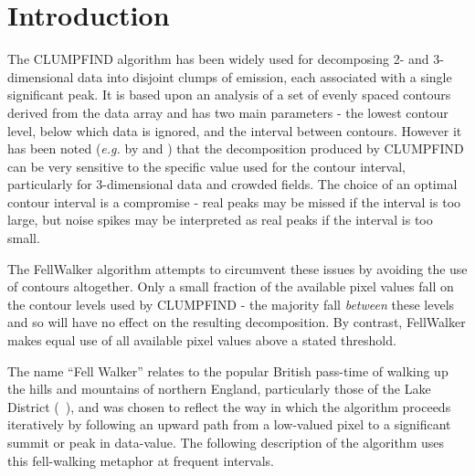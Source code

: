 \documentclass[final,authoryear,5p,times,twocolumn]{elsarticle}
\begin{document}

\newcommand{\mnras}{Mon Not R Astron Soc}
\newcommand{\aap}{Astron Astrophys}
\newcommand{\aaps}{Astron Astrophys Supp}
\newcommand{\pasp}{Pub Astron Soc Pacific}
\newcommand{\apj}{Astrophys J}
\newcommand{\apjs}{Astrophys J Supp}
\newcommand{\qjras}{Quart J R Astron Soc}
\newcommand{\an}{Astron.\ Nach.}
\newcommand{\ijimw}{Int.\ J.\ Infrared \& Millimeter Waves}
\newcommand{\procspie}{Proc.\ SPIE}
\newcommand{\aspconf}{ASP Conf. Ser.}

\newcommand{\ascl}[1]{\href{http://www.ascl.net/#1}{ascl:#1}}

\section{Introduction}
\label{sec:intro}

The CLUMPFIND algorithm \citep[][\ascl{1107.014}]{1994Williams} has been
widely used for decomposing 2- and 3-dimensional data into disjoint
clumps of emission, each associated with a single significant peak. It is
based upon an analysis of a set of evenly spaced contours derived from
the data array and has two main parameters - the lowest contour level,
below which data is ignored, and the interval between contours. However
it has been noted (\emph{e.g.} by \cite{2009Pineda} and
\cite{2014Christie}) that the decomposition produced by CLUMPFIND can be
very sensitive to the specific value used for the contour interval,
particularly for 3-dimensional data and crowded fields. The choice of an
optimal contour interval is a compromise - real peaks may be missed if
the interval is too large, but noise spikes may be interpreted as real
peaks if the interval is too small.

The FellWalker algorithm attempts to circumvent these issues by avoiding
the use of contours altogether. Only a small fraction of the available
pixel values fall on the contour levels used by CLUMPFIND - the majority
fall \emph{between} these levels and so will have no effect on the
resulting decomposition. By contrast, FellWalker makes equal use of all
available pixel values above a stated threshold.

The name ``Fell Walker'' relates to the popular British pass-time of
walking up the hills and mountains of northern England, particularly
those of the Lake District
(~), and was
chosen to reflect the way in which the algorithm proceeds iteratively by
following an upward path from a low-valued pixel to a significant summit
or peak in data-value. The following description of the algorithm uses
this fell-walking metaphor at frequent intervals.
\end{document}
